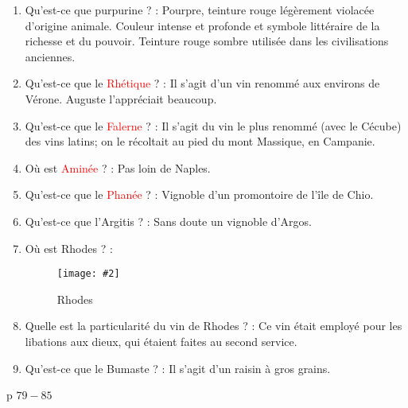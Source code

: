 \documentclass[a4paper, 11pt, hidelinks]{article}
\newcommand{\img}[4]{\begin{figure}[!ht]
    \centering
    \texttt{[image: \#2]}
    \caption{#3}
    \label{#4}
    \end{figure} }
\begin{document}
\begin{enumerate}
      \item Qu'est-ce que purpurine ? : Pourpre, teinture rouge légèrement violacée d'origine animale. Couleur intense
            et profonde et symbole littéraire de la richesse et du pouvoir. Teinture rouge sombre utilisée dans les
            civilisations anciennes.
      \item Qu'est-ce que le \textcolor{red}{Rhétique} ? : Il s'agit d'un vin renommé aux environs de Vérone. Auguste l'appréciait beaucoup.
      \item Qu'est-ce que le \textcolor{red}{Falerne} ? : Il s'agit du vin le plus renommé (avec le Cécube) des vins latins; on le récoltait au pied
            du mont Massique, en Campanie.
      \item Où est \textcolor{red}{Aminée} ? : Pas loin de Naples.
      \item Qu'est-ce que le \textcolor{red}{Phanée} ? : Vignoble d'un promontoire de l'île de Chio.
      \item Qu'est-ce que l'Argitis ? : Sans doute un vignoble d'Argos.
      \item Où est Rhodes ? :
            \img{0.5}{Rhodes.png}{Rhodes}{69}
      \item Quelle est la particularité du vin de Rhodes ? : Ce vin était employé pour les libations aux dieux, qui étaient faites
            au second service.
      \item Qu'est-ce que le Bumaste ? : Il s'agit d'un raisin à gros grains.
\end{enumerate}

p $79 - 85$
\end{document}
